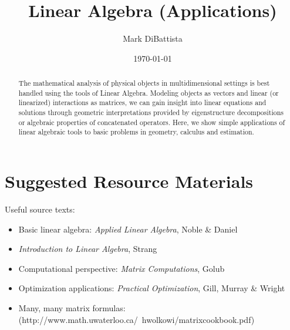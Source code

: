 \documentclass[12pt, twoside, draft]{article}
\begin{document}
\setpagewiselinenumbers


\title{Linear Algebra (Applications)}

\footnotesize\date{\today}

\author{Mark DiBattista}

\maketitle

\begin{abstract}
The mathematical analysis of physical objects in multidimensional settings is best handled using the tools of Linear Algebra.  Modeling objects as vectors and linear (or linearized) interactions as matrices, we can gain insight into linear equations and solutions through geometric interpretations provided by eigenstructure decompositions or algebraic properties of concatenated operators.  Here, we show simple applications of linear algebraic tools to basic problems in geometry, calculus and estimation. 
\end{abstract}


\section{Suggested Resource Materials}
Useful source texts:

\begin{itemize}[noitemsep]
\item Basic linear algebra:\hspace{50pt} \textit{Applied Linear Algebra}, Noble \& Daniel
\item[] \hspace{140pt} \textit{Introduction to Linear Algebra}, Strang
\item Computational perspective: \hspace{13pt} \textit{Matrix Computations}, Golub
\item Optimization applications: \hspace{18pt} \textit{Practical Optimization}, Gill, Murray \& Wright
\item Many, many matrix formulas: (http://www.math.uwaterloo.ca/~hwolkowi/matrixcookbook.pdf)
\end{itemize}
\end{document}
